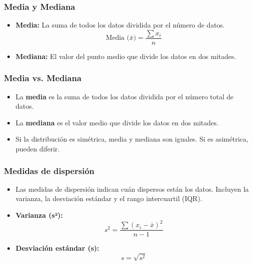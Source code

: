 \documentclass[aspectratio=169]{beamer}
\begin{document}
\begin{frame}
\frametitle{Media y Mediana}

\begin{itemize}
    \item \textbf{Media:} La suma de todos los datos dividida por el número de datos. 
    \begin{equation*}
    \text{Media (}\bar{x}\text{)} = \frac{\sum x_i}{n}
    \end{equation*}
    \item \textbf{Mediana:} El valor del punto medio que divide los datos en dos mitades.
\end{itemize}

\end{frame}



\begin{frame}
\frametitle{Media vs. Mediana}

\begin{itemize}
    \item La \textbf{media} es la suma de todos los datos dividida por el número total de datos.
    \item La \textbf{mediana} es el valor medio que divide los datos en dos mitades.
    \item Si la distribución es simétrica, media y mediana son iguales. Si es asimétrica, pueden diferir.
\end{itemize}

\end{frame}

\begin{frame}
\frametitle{Medidas de dispersión}

\begin{itemize}
    \item Las medidas de dispersión indican cuán dispersos están los datos. Incluyen la varianza, la desviación estándar y el rango intercuartil (IQR).
    \item \textbf{Varianza (s²):} 
    \begin{equation*}
    s^2 = \frac{\sum (x_i - \bar{x})^2}{n-1}
    \end{equation*}
    \item \textbf{Desviación estándar (s):} 
    \begin{equation*}
    s = \sqrt{s^2}
    \end{equation*}
\end{itemize}

\end{frame}
\end{document}
